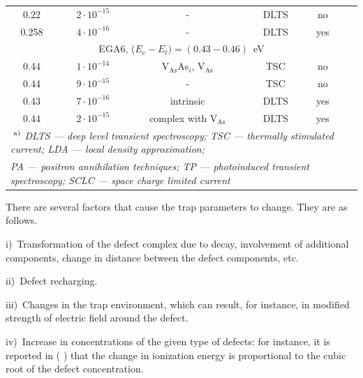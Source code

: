 \documentclass[final,3p,times,twocolumn,authoryear]{elsarticle}
\begin{document}
\begin{table}
\begin{tabular}{cccccc}
0.22&$2\cdot10^{-15}$&-&DLTS&no&\cite{Fang:EL6}\\ %
0.258&$4\cdot10^{-16}$&-&DLTS&yes&\cite{Yousefi1995}\\ %
\multicolumn{6}{c}{EGA6, ($E_c-E_t)=(0.43-0.46)$~eV}\\
0.44&$1\cdot10^{-14}$&V$_\mathrm{As}$As$_i$, V$_\mathrm{As}$&TSC&no&\cite{Pavlovic2000}\\ %
0.44&$9\cdot10^{-15}$&-&TSC&no&\cite{Pavlovic:GaAs}\\ %
\multirow{2}{*}{0.43}&\multirow{2}{*}{$7\cdot10^{-16}$}&\multirow{2}{*}{intrinsic}&\multirow{2}{*}{DLTS}&\multirow{2}{*}{yes}&\cite{Lefevre1977}\\
&&&&&\cite{Bourgoin:GaAs}\\
0.44&$2\cdot10^{-15}$&complex with V$_\mathrm{As}$&DLTS&yes&\cite{KolFTP1989En}\\ %
\multicolumn{6}{l}{$\textsuperscript{ a)}$ \emph{DLTS --- deep level transient spectroscopy;
TSC --- thermally stimulated current; LDA --- local density approximation;}}\\
\multicolumn{6}{l}{ \emph{PA --- positron annihilation techniques;
TP --- photoinduced transient spectroscopy;
SCLC --- space charge limited current}}\\
\hline
\end{tabular}
\end{table}

There are several factors that cause the trap parameters to change.
They are as follows.

\noindent
i)~Transformation of the defect complex due to decay, involvement of additional components, change in distance between the defect components, etc.

\noindent
ii)~Defect recharging.

\noindent
iii)~Changes in the trap environment, which can result, for instance, in modified strength of electric field around the defect.

\noindent
iv)~Increase in concentrations of the given type of defects:
for instance, it is reported in (\cite{Stellmacher} ) that the change in ionization energy is proportional to the cubic root of the defect concentration.
\end{document}
